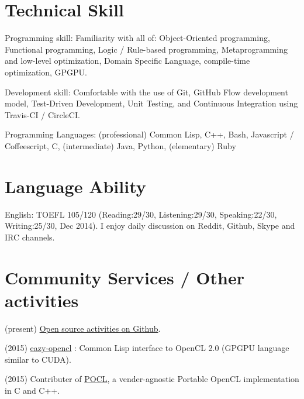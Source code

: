 \documentclass[letterpaper,12pt]{article}
\begin{document}
\section{Technical Skill}

\begin{CV}
 \item[Programming skill:] Familiarity with all of: 
 Object-Oriented programming,
 Functional programming,
 Logic / Rule-based programming,
 Metaprogramming and low-level optimization,
 Domain Specific Language, compile-time optimization, GPGPU.
 \item[Development skill:] Comfortable with the use of Git,
 GitHub Flow development model, Test-Driven Development, Unit
 Testing, and Continuous Integration using Travis-CI / CircleCI.
 \item[Programming Languages:]
 (professional) Common Lisp, C++, Bash, Javascript / Coffeescript, C,
 (intermediate) Java, Python,
 (elementary)   Ruby
\end{CV}

\section{Language Ability}

\begin{CV}
 \item[English:] TOEFL 105/120 (Reading:29/30, Listening:29/30,
 Speaking:22/30, Writing:25/30, Dec 2014). I enjoy daily discussion
 on Reddit, Github, Skype and IRC channels.
\end{CV}

\section{Community Services / Other activities}

(present) \href{https://github.com/guicho271828}{Open source activities on Github}.

(2015) \href{https://github.com/guicho271828/eazy-opencl}{eazy-opencl}
: Common Lisp interface to OpenCL 2.0 (GPGPU language similar to CUDA).

(2015) Contributer of \href{https://github.com/pocl/pocl}{POCL},
a vender-agnostic Portable OpenCL implementation in C and C++.
\end{document}
